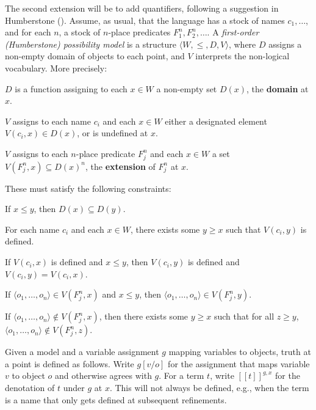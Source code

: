 \documentclass[
  10.5pt,
  twoside]{article}
\providecommand{\tightlist}{%
  \setlength{\itemsep}{0pt}\setlength{\parskip}{0pt}}
\let\olddescription\description
\let\endolddescription\enddescription
\renewenvironment{description}
  {\vskip 5pt\olddescription}
  {\endolddescription\vskip 5pt}
\let\olditemize\itemize
\let\endolditemize\enditemize
\renewenvironment{itemize}
  {\vskip 5pt\olditemize}
  {\endolditemize\vskip 5pt}
\newcommand{\llbracket}{[\![}
\newcommand{\rrbracket}{]\!]}
\begin{document}
The second extension will be to add quantifiers, following a suggestion
in Humberstone (). Assume, as
usual, that the language has a stock of names \(c_1, \dots\), and for
each \(n\), a stock of \(n\)-place predicates \(F^n_1, F^n_2, \dots\). A
\emph{first-order (Humberstone) possibility model} is a structure
\mbox{$\langle W, \leqslant, D, V \rangle$}, where \(D\) assigns a
non-empty domain of objects to each point, and \(V\) interprets the
non-logical vocabulary. More precisely:

\begin{itemize}
\tightlist
\item
  \(D\) is a function assigning to each \(x \in W\) a non-empty set
  \(D(x)\), the \textbf{domain} at \(x\).
\item
  \(V\) assigns to each name \(c_i\) and each \(x \in W\) either a
  designated element \(V(c_i, x) \in D(x)\), or is undefined at \(x\).
\item
  \(V\) assigns to each \(n\)-place predicate \(F^n_j\) and each
  \(x \in W\) a set \(V(F^n_j, x) \subseteq D(x)^n\), the
  \textbf{extension} of \(F^n_j\) at \(x\).
\end{itemize}

These must satisfy the following constraints:

\begin{description}
\tightlist
\item[Domain monotonicity]
If \(x \leqslant y\), then \(D(x) \subseteq D(y)\).
\item[Name coverage]
For each name \(c_i\) and each \(x \in W\), there exists some
\(y \geqslant x\) such that \(V(c_i, y)\) is defined.
\item[Persistence for names]
If \(V(c_i, x)\) is defined and \(x \leqslant y\), then \(V(c_i, y)\) is
defined and \(V(c_i, y) = V(c_i, x)\).
\item[Persistence for predicate extensions]
If \mbox{$\langle o_1, \dots, o_n \rangle \in V(F^n_j, x)$} and
\(x \leqslant y\), then
\mbox{$\langle o_1, \dots, o_n \rangle \in V(F^n_j, y)$}.
\item[Refinability for predicate extensions]
If \mbox{$\langle o_1, \dots, o_n \rangle \notin V(F^n_j, x)$}, then
there exists some \(y \geqslant x\) such that for all \(z \geqslant y\),
\mbox{$\langle o_1, \dots, o_n \rangle \notin V(F^n_j, z)$}.
\end{description}

Given a model and a variable assignment \(g\) mapping variables to
objects, truth at a point is defined as follows. Write \(g[v/o]\) for
the assignment that maps variable \(v\) to object \(o\) and otherwise
agrees with \(g\). For a term \(t\), write
\(\llbracket t \rrbracket^{g,x}\) for the denotation of \(t\) under
\(g\) at \(x\). This will not always be defined, e.g., when the term is
a name that only gets defined at subsequent refinements.
\end{document}
